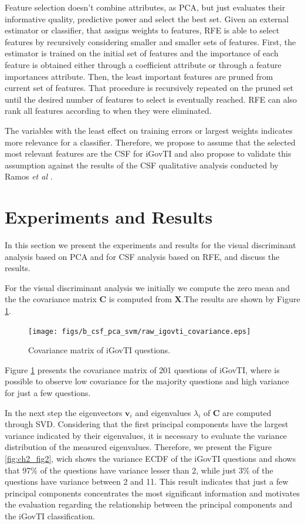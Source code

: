 Feature selection doesn't combine attributes, as PCA, but just evaluates their informative quality, predictive power and select the best set. Given an external estimator or classifier, that assigns weights to features, RFE is able to select features by recursively considering smaller and smaller sets of features. First, the estimator is trained on the initial set of features and the importance of each feature is obtained either through a coefficient attribute or through a feature importances attribute. Then, the least important features are pruned from current set of features. That procedure is recursively repeated on the pruned set until the desired number of features to select is eventually reached. RFE can also rank all features according to when they were eliminated. 

The variables with the least effect on training errors or largest weights indicates more relevance for a classifier. Therefore, we propose to assume that the selected most relevant features are the CSF for iGovTI and also propose to validate this assumption against the results of the CSF qualitative analysis conducted by Ramos \emph{et al} \cite{ramos2016information}.


\section{Experiments and Results}
\label{sec:b_experimentalresults}

In this section we present the experiments and results for the visual discriminant analysis based on PCA and for CSF analysis based on RFE, and discuss the results.

For the visual discriminant analysis we initially we compute the zero mean and the the covariance matrix $\mathbf{C}$ is computed from $\mathbf{X}$.The results are shown by Figure \ref{fig:ch2_fig1}.
 
\begin{figure}[h!]
     \centering 
     \texttt{[image: figs/b\_csf\_pca\_svm/raw\_igovti\_covariance.eps]}
     \caption{Covariance matrix of iGovTI questions.}
     \label{fig:ch2_fig1}
\end{figure}

Figure \ref{fig:ch2_fig1} presents the covariance matrix of 201 questions of iGovTI, where is possible to observe low covariance for the majority questions and high variance for just a few questions. 

In the next step the eigenvectors $\mathbf{v}_i$ and eigenvalues $\lambda_i$ of $\mathbf{C}$ are computed through SVD. Considering that the first principal components have the largest variance indicated by their eigenvalues, it is necessary to evaluate the variance distribution of the measured eigenvalues. Therefore, we present the Figure \ref{fig:ch2_fig2}, wich shows the variance ECDF of the iGovTI questions and shows that 97\% of the questions have variance lesser than 2, while just 3\% of the questions have variance between 2 and 11. This result indicates that just a few principal components concentrates the most significant information and motivates the evaluation regarding the relationship between the principal components and the iGovTI classification.

